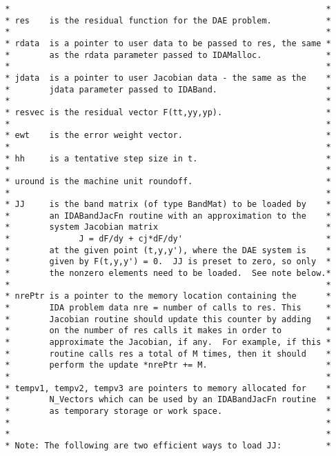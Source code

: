 \documentclass[11pt]{article}
\begin{document}
\begin{verbatim}
 *                                                                *
 * res    is the residual function for the DAE problem.           *
 *                                                                *
 * rdata  is a pointer to user data to be passed to res, the same *
 *        as the rdata parameter passed to IDAMalloc.             *
 *                                                                *
 * jdata  is a pointer to user Jacobian data - the same as the    *
 *        jdata parameter passed to IDABand.                      *
 *                                                                *
 * resvec is the residual vector F(tt,yy,yp).                     *
 *                                                                *
 * ewt    is the error weight vector.                             *
 *                                                                *
 * hh     is a tentative step size in t.                          *
 *                                                                *
 * uround is the machine unit roundoff.                           *
 *                                                                *
 * JJ     is the band matrix (of type BandMat) to be loaded by    *
 *        an IDABandJacFn routine with an approximation to the    *
 *        system Jacobian matrix                                  *
 *              J = dF/dy + cj*dF/dy'                             *
 *        at the given point (t,y,y'), where the DAE system is    *
 *        given by F(t,y,y') = 0.  JJ is preset to zero, so only  *
 *        the nonzero elements need to be loaded.  See note below.*
 *                                                                *
 * nrePtr is a pointer to the memory location containing the      *
 *        IDA problem data nre = number of calls to res. This     *
 *        Jacobian routine should update this counter by adding   *
 *        on the number of res calls it makes in order to         *
 *        approximate the Jacobian, if any.  For example, if this *
 *        routine calls res a total of M times, then it should    *
 *        perform the update *nrePtr += M.                        *
 *                                                                *
 * tempv1, tempv2, tempv3 are pointers to memory allocated for    *
 *        N_Vectors which can be used by an IDABandJacFn routine  *
 *        as temporary storage or work space.                     *
 *                                                                *
 *                                                                *
 * Note: The following are two efficient ways to load JJ:         *

\end{verbatim}
\end{document}
